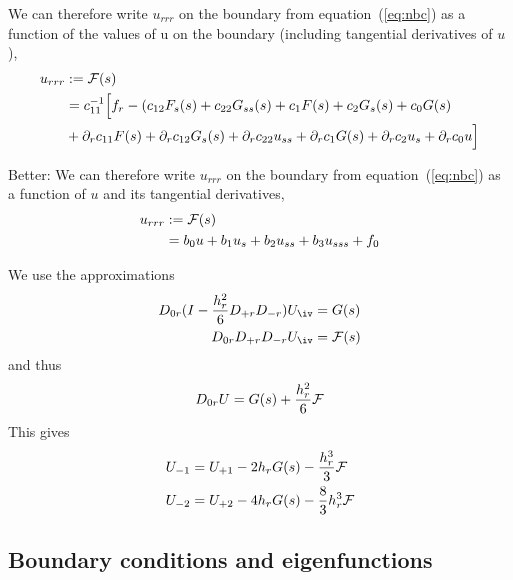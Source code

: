 \newcommand{\Fs}{{\cal F}}
We can therefore write $u_{rrr}$ on the boundary from equation~(\ref{eq:nbc})
as a function of the values of u on the boundary (including
tangential derivatives of $u$),
\begin{align}
u_{rrr} & := \Fs(s) \\
        & = c_{11}^{-1}\Big[ f_r - ( c_{12} F_s(s) + c_{22} G_{ss}(s) + c_1 F(s) + c_2 G_s(s)+ c_0 G(s) \\
        & + \partial_r c_{11} F(s) + \partial_r c_{12} G_s(s) + \partial_r c_{22} u_{ss} + 
                  \partial_r c_1 G(s) + \partial_r c_2 u_s + \partial_r c_0 u \Big] 
\end{align}

Better: We can therefore write $u_{rrr}$ on the boundary from equation~(\ref{eq:nbc})
as a function of $u$ and its tangential derivatives,
\begin{align}
u_{rrr} & := \Fs(s) \\
        & =  b_0 u + b_1 u_{s} + b_2 u_{ss} + b_3 u_{sss} + f_0
\end{align}


We use the approximations
\begin{align}
  D_{0r}( I - {h_r^2\over6} D_{+r}D_{-r}) U_\iv &= G(s) \\
  D_{0r} D_{+r}D_{-r} U_\iv &= \Fs(s) 
\end{align}
and thus 
\[
   D_{0r}U = G(s) + {h_r^2\over6}\Fs
\]
This gives
\begin{align}
    U_{-1} &= U_{+1} - 2 h_r G(s) - {h_r^3\over3}\Fs \\
    U_{-2} &= U_{+2} - 4 h_r G(s) - {8\over3}h_r^3\Fs 
\end{align}
    





\clearpage

\subsection{Boundary conditions and eigenfunctions}


